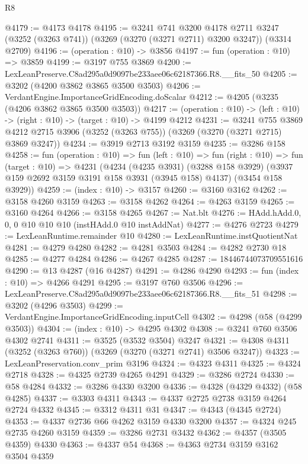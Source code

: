 \begin{lexlean}{R8}
\begin{coremodule}
@4179 := @4173 @4178
@4195 := @3241
    @741
    @3200
    @4178
    @2711
    @3247
    (@3252 (@3263 @741))
    (@3269 (@3270 (@3271 @2711) @3200 @3247))
    (@3314 @2709)
@4196 := (operation : @10) -> @3856
@4197 := fun (operation : @10) => @3859
@4199 := @3197 @755 @3869
@4200 := LexLeanPreserve.C8ad295a0d9097be233aee06c62187366.R8.__fits_50
@4205 := @3202 (@4200 @3862 @3865 @3500 @3503)
@4206 := VerdantEngine.ImportanceGridEncoding.doScalar
@4212 := @4205 (@3235 (@4206 @3862 @3865 @3500 @3503))
@4217 := (operation : @10) -> (left : @10) -> (right : @10) -> (target : @10) -> @4199 @4212
@4231 := @3241
    @755
    @3869
    @4212
    @2715
    @3906
    (@3252 (@3263 @755))
    (@3269 (@3270 (@3271 @2715) @3869 @3247))
@4234 := @3919 @2713 @3192 @3159
@4235 := @3286 @158
@4258 := fun (operation : @10) =>
  fun (left : @10) =>
  fun (right : @10) =>
  fun (target : @10) =>
  @4231
    (@4234
      (@4235 @3931)
      (@3288 @158 @3929)
      (@3937 @159 @2692 @3159 @3191 @158 @3931 (@3945 @158) @4137)
      (@3454 @158 @3929))
@4259 := (index : @10) -> @3157
@4260 := @3160 @3162
@4262 := @3158 @4260 @3159
@4263 := @3158 @4262
@4264 := @4263 @3159
@4265 := @3160 @4264
@4266 := @3158 @4265
@4267 := Nat.blt
@4276 := HAdd.hAdd.{0, 0, 0} @10 @10 @10 (instHAdd.{0} @10 instAddNat)
@4277 := @4276 @2723
@4279 := LexLeanRuntime.remainder @10
@4280 := LexLeanRuntime.instQuotientNat
@4281 := @4279 @4280
@4282 := @4281 @3503
@4284 := @4282 @2730 @18
@4285 := @4277 @4284
@4286 := @4267 @4285
@4287 := 18446744073709551616
@4290 := @13 @4287 (@16 @4287)
@4291 := @4286 @4290
@4293 := fun (index : @10) => @4266 @4291
@4295 := @3197 @760 @3506
@4296 := LexLeanPreserve.C8ad295a0d9097be233aee06c62187366.R8.__fits_51
@4298 := @3202 (@4296 @3503)
@4299 := VerdantEngine.ImportanceGridEncoding.inputCell
@4302 := @4298 (@58 (@4299 @3503))
@4304 := (index : @10) -> @4295 @4302
@4308 := @3241 @760 @3506 @4302 @2741
@4311 := @3525 (@3532 @3504) @3247
@4321 := @4308 @4311 (@3252 (@3263 @760)) (@3269 (@3270 (@3271 @2741) @3506 @3247))
@4323 := LexLeanPreservation.conv_prim @3196
@4324 := @4323 @4311
@4325 := @4324 @2718
@4328 := @4325 @2739 @4265 @4291
@4329 := @3286 @2724
@4330 := @58 @4284
@4332 := @3286 @4330 @3200
@4336 := @4328 (@4329 @4332) (@58 @4285)
@4337 := @3303 @4311
@4343 := @4337 @2725 @2738 @3159 @4264 @2724 @4332
@4345 := @3312 @4311 @31
@4347 := @4343 (@4345 @2724)
@4353 := @4337 @2736 @66 @4262 @3159 @4330 @3200
@4357 := @4324 @245 @2735 @4260 @3159
@4359 := @3286 @2731 @3432
@4362 := @4357 (@3505 @4359) @4330
@4363 := @4337 @54
@4368 := @4363 @2734 @3159 @3162 @3504 @4359

\end{coremodule}
\end{lexlean}
